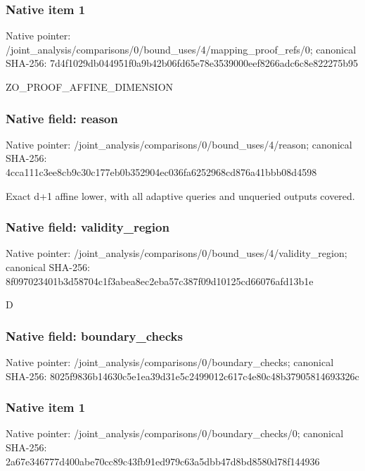 \documentclass[10pt,a4paper]{article}
\begin{document}
\subsubsection{Native item 1}
Native pointer: /joint\_\allowbreak{}analysis/comparisons/0/bound\_\allowbreak{}uses/4/mapping\_\allowbreak{}proof\_\allowbreak{}refs/0; canonical SHA-256: 7d4f1029db044951f0a9b42b06fd65e78e3539000eef8266adc6c8e822275b95

\begingroup\raggedright\sloppy ZO\_\allowbreak{}PROOF\_\allowbreak{}AFFINE\_\allowbreak{}DIMENSION\par\endgroup

\subsubsection{Native field: reason}
Native pointer: /joint\_\allowbreak{}analysis/comparisons/0/bound\_\allowbreak{}uses/4/reason; canonical SHA-256: 4cca111c3ee8cb9c30c177eb0b352904ec036fa6252968cd876a41bbb08d4598

\begingroup\raggedright\sloppy Exact d+1 affine lower,\allowbreak{} with all adaptive queries and unqueried outputs covered.\par\endgroup

\subsubsection{Native field: validity\_\allowbreak{}region}
Native pointer: /joint\_\allowbreak{}analysis/comparisons/0/bound\_\allowbreak{}uses/4/validity\_\allowbreak{}region; canonical SHA-256: 8f097023401b3d58704c1f3abea8ec2eba57c387f09d10125cd66076afd13b1e

\begingroup\raggedright\sloppy D\par\endgroup

\subsubsection{Native field: boundary\_\allowbreak{}checks}
Native pointer: /joint\_\allowbreak{}analysis/comparisons/0/boundary\_\allowbreak{}checks; canonical SHA-256: 8025f9836b14630c5e1ea39d31e5c2499012c617c4e80c48b37905814693326c

\subsubsection{Native item 1}
Native pointer: /joint\_\allowbreak{}analysis/comparisons/0/boundary\_\allowbreak{}checks/0; canonical SHA-256: 2a67e346777d400abe70cc89c43fb91ed979c63a5dbb47d8bd8580d78f144936
\end{document}
